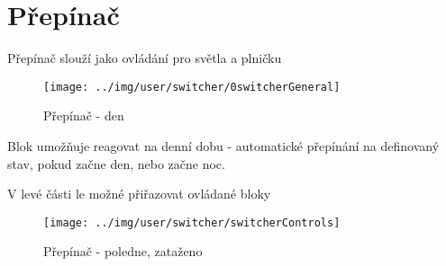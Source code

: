 
\section{Přepínač}

Přepínač slouží jako ovládání pro světla a plničku

\begin{figure}[!ht]\centering
\texttt{[image: ../img/user/switcher/0switcherGeneral]}

\caption{Přepínač - den}
\label{fig:user_switcher_0switcherGeneral}

\end{figure}

\FloatBarrier

Blok umožňuje reagovat na denní dobu - automatické přepínání na definovaný stav, pokud začne den, nebo začne noc.

V levé části le možné přiřazovat ovládané bloky

\begin{figure}[!ht]\centering
\texttt{[image: ../img/user/switcher/switcherControls]}

\caption{Přepínač - poledne, zataženo}
\label{fig:user_switcher_switcherControls}

\end{figure}


\FloatBarrier